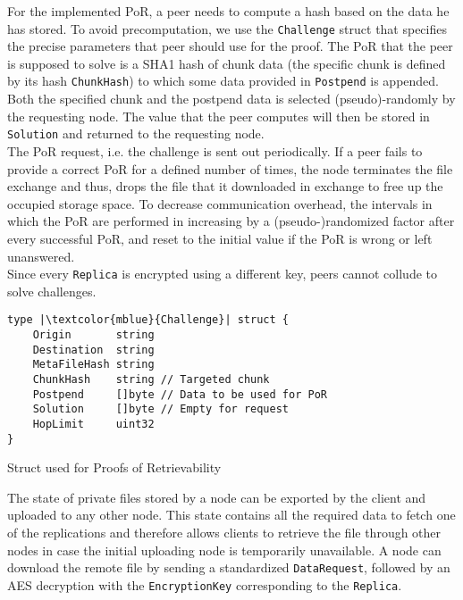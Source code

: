 \documentclass{article}
\begin{document}
For the implemented PoR, a peer needs to compute a hash based on the data he has stored. To avoid precomputation, we use the \texttt{Challenge} struct that specifies the precise parameters that peer should use for the proof. The PoR that the peer is supposed to solve is a SHA1 hash of chunk data (the specific chunk is defined by its hash \texttt{ChunkHash}) to which some data provided in \texttt{Postpend} is appended. Both the specified chunk and the postpend data is selected (pseudo)-randomly by the requesting node. The value that the peer computes will then be stored in \texttt{Solution} and returned to the requesting node.
\\
The PoR request, i.e. the challenge is sent out periodically. If a peer fails to provide a correct PoR for a defined number of times, the node terminates the file exchange and thus, drops the file that it downloaded in exchange to free up the occupied storage space. 
To decrease communication overhead, the intervals in which the PoR are performed in increasing by a (pseudo-)randomized factor after every successful PoR, and reset to the initial value if the PoR is wrong or left unanswered.
\\
Since every \texttt{Replica} is encrypted using a different key, peers cannot collude to solve challenges.   

\begin{listing}
\begin{verbatim}
type |\textcolor{mblue}{Challenge}| struct {
	Origin       string
	Destination  string
	MetaFileHash string 
	ChunkHash    string // Targeted chunk
	Postpend     []byte // Data to be used for PoR
	Solution     []byte // Empty for request
	HopLimit     uint32
}
\end{verbatim}
\caption{Struct used for Proofs of Retrievability}
\end{listing}

The state of private files stored by a node can be exported by the client and uploaded to any other node. This state contains all the required data to fetch one of the replications and therefore allows clients to retrieve the file through other nodes in case the initial uploading node is temporarily unavailable. A node can download the remote file by sending a standardized \texttt{DataRequest}, followed by an AES decryption with the \texttt{EncryptionKey} corresponding to the \texttt{Replica}. 
\\\vspace{0.5em}
\end{document}
